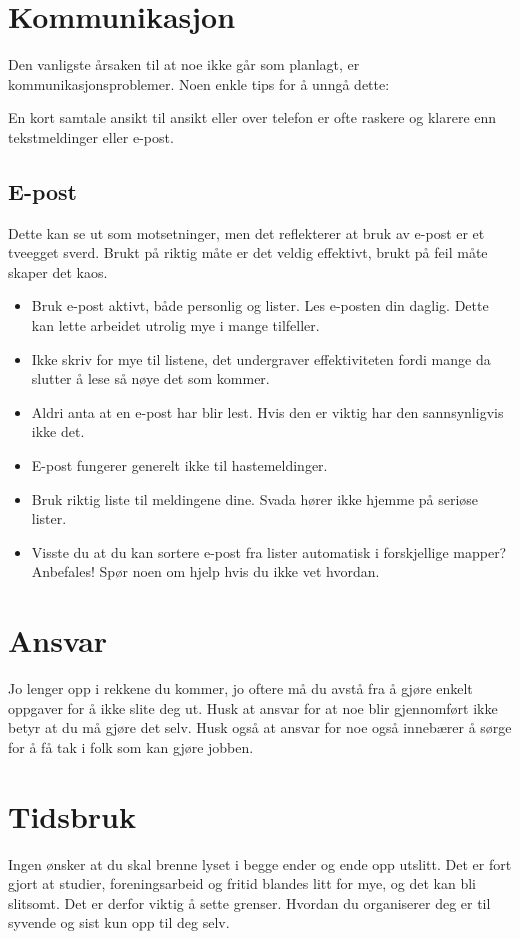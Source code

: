 \section{Kommunikasjon}
Den vanligste årsaken til at noe ikke går som planlagt, er
kommunikasjonsproblemer. Noen enkle tips for å unngå dette:

En kort samtale ansikt til ansikt eller over telefon er ofte raskere og klarere enn tekstmeldinger eller e-post.

\subsection{E-post}
Dette kan se ut som motsetninger, men det reflekterer at bruk av e-post
er et tveegget sverd. Brukt på riktig måte er det veldig effektivt,
brukt på feil måte skaper det kaos.
\begin{itemize}
\item Bruk e-post aktivt, både personlig og lister. Les e-posten din daglig. Dette kan lette arbeidet utrolig mye i mange tilfeller.
\item Ikke skriv for mye til listene, det undergraver effektiviteten fordi mange da slutter å lese så nøye det som kommer.
\item Aldri anta at en e-post har blir lest. Hvis den er viktig har den sannsynligvis ikke det.
\item E-post fungerer generelt ikke til hastemeldinger.
\item Bruk riktig liste til meldingene dine. Svada hører ikke hjemme på seriøse lister.
\item Visste du at du kan sortere e-post fra lister automatisk i forskjellige mapper? Anbefales! Spør noen om hjelp hvis du ikke vet hvordan.
\end{itemize}


\section{Ansvar}
Jo lenger opp i rekkene du kommer, jo oftere må du avstå fra å gjøre enkelt oppgaver for å ikke slite deg ut. Husk at ansvar for at noe blir gjennomført ikke betyr at du må gjøre det selv. Husk også at ansvar for noe også innebærer å sørge for å få tak i folk som kan gjøre jobben.

\section{Tidsbruk}
Ingen ønsker at du skal brenne lyset i begge ender og ende opp utslitt. Det er fort gjort at studier, foreningsarbeid og fritid blandes litt for mye, og det kan bli slitsomt. Det er derfor viktig å sette grenser. Hvordan du organiserer deg er til syvende og sist kun opp til deg selv.
